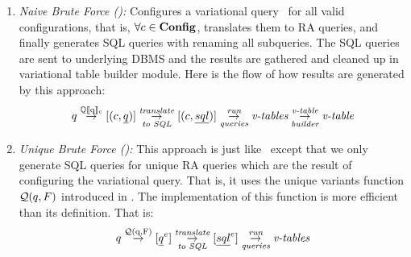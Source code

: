 \begin{enumerate}
\item
\emph{Naive Brute Force (\nbf):}
Configures a variational query \vQ\ for all valid configurations, that is, 
\ensuremath{\forall \config \in \confSet}, translates them to RA queries,
and finally generates SQL queries with renaming all subqueries. The 
SQL queries are sent to underlying DBMS and the results are gathered and
cleaned up in variational table builder module. Here is the flow of how results are generated by 
this approach:
%
\[\vQ \mathrel{\mathop{\rightarrow}^{\mathrm{\eeSem \vQ}}} [ ( \config, \pQ ) ] 
\mathrel{\mathop{\rightarrow}^{\mathrm{\textit{translate}}}_{\mathrm{\textit{to SQL}}}} [ ( \config, \sqlQ ) ]
\mathrel{\mathop{\rightarrow}^{\mathrm{\textit{run}}}_{\mathrm{\textit{queries}}}} \textit{v-tables}
\mathrel{\mathop{\rightarrow}^{\mathrm{\textit{v-table}}}_{\mathrm{\textit{builder}}}} \textit{v-table}
\]
%
%
\item
\emph{Unique Brute Force (\ubf):}
This approach is just like \nbf\ except that we only generate SQL 
queries for unique RA queries which are the result of configuring the variational query.
That is, it uses the unique variants function \ensuremath{\qGroup \vQ} introduced
in .
The implementation of this function is more efficient than its definition.
That is:
%
\[\vQ \mathrel{\mathop{\rightarrow}^{\mathrm{\qGroup \vQ}}} [ \annot [\dimMeta] {\pQ} ] 
\mathrel{\mathop{\rightarrow}^{\mathrm{\textit{translate}}}_{\mathrm{\textit{to SQL}}}} [ \annot [\dimMeta] {\sqlQ} ]
\mathrel{\mathop{\rightarrow}^{\mathrm{\textit{run}}}_{\mathrm{\textit{queries}}}} \textit{v-tables}
\]
\end{enumerate}
